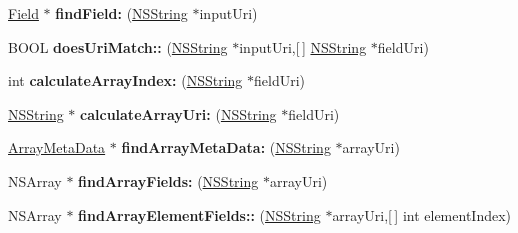 \begin{DoxyCompactItemize}
\item 
\hypertarget{interface_mobile_object_af67107d4bdd2d493709dfb5550bd0b71}{
\hyperlink{interface_field}{\-Field} $\ast$ {\bfseries find\-Field\-:} (\hyperlink{class_n_s_string}{\-N\-S\-String} $\ast$input\-Uri)}
\label{interface_mobile_object_af67107d4bdd2d493709dfb5550bd0b71}

\item 
\hypertarget{interface_mobile_object_a72146ccc4b6fdc8f630b533244eaf359}{
\-B\-O\-O\-L {\bfseries does\-Uri\-Match\-::} (\hyperlink{class_n_s_string}{\-N\-S\-String} $\ast$input\-Uri,\mbox{[}$\,$\mbox{]} \hyperlink{class_n_s_string}{\-N\-S\-String} $\ast$field\-Uri)}
\label{interface_mobile_object_a72146ccc4b6fdc8f630b533244eaf359}

\item 
\hypertarget{interface_mobile_object_a8f0ed77157a50c86ccff642a2443168d}{
int {\bfseries calculate\-Array\-Index\-:} (\hyperlink{class_n_s_string}{\-N\-S\-String} $\ast$field\-Uri)}
\label{interface_mobile_object_a8f0ed77157a50c86ccff642a2443168d}

\item 
\hypertarget{interface_mobile_object_a64803c8493550bff058f6b4d387ec0d4}{
\hyperlink{class_n_s_string}{\-N\-S\-String} $\ast$ {\bfseries calculate\-Array\-Uri\-:} (\hyperlink{class_n_s_string}{\-N\-S\-String} $\ast$field\-Uri)}
\label{interface_mobile_object_a64803c8493550bff058f6b4d387ec0d4}

\item 
\hypertarget{interface_mobile_object_a8ebfcd27e9b97aa820564fdac11c81ef}{
\hyperlink{interface_array_meta_data}{\-Array\-Meta\-Data} $\ast$ {\bfseries find\-Array\-Meta\-Data\-:} (\hyperlink{class_n_s_string}{\-N\-S\-String} $\ast$array\-Uri)}
\label{interface_mobile_object_a8ebfcd27e9b97aa820564fdac11c81ef}

\item 
\hypertarget{interface_mobile_object_a981953ff8a64b10fef2229997b014f68}{
\-N\-S\-Array $\ast$ {\bfseries find\-Array\-Fields\-:} (\hyperlink{class_n_s_string}{\-N\-S\-String} $\ast$array\-Uri)}
\label{interface_mobile_object_a981953ff8a64b10fef2229997b014f68}

\item 
\hypertarget{interface_mobile_object_a5a2b6c4c936aa527df4a0b897924bc65}{
\-N\-S\-Array $\ast$ {\bfseries find\-Array\-Element\-Fields\-::} (\hyperlink{class_n_s_string}{\-N\-S\-String} $\ast$array\-Uri,\mbox{[}$\,$\mbox{]} int element\-Index)}
\label{interface_mobile_object_a5a2b6c4c936aa527df4a0b897924bc65}


\end{DoxyCompactItemize}

